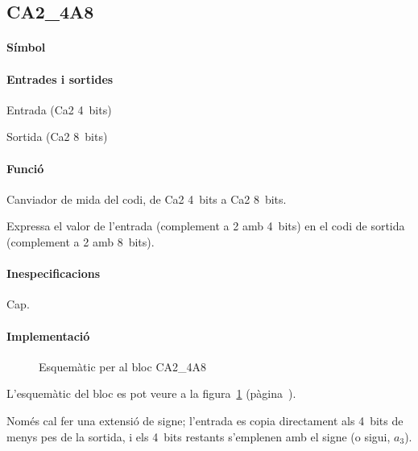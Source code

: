 \subsection{\label{sub:\projectname-CA2_4A8} \textsf{CA2\_4A8}}

\paragraph{Símbol}
\begin{center}  \end{center}

\paragraph{Entrades i sortides}

\begin{where}
\item[\nodenamerange{a}{3}{0}] Entrada (Ca2 4~bits)
\item[\nodenamerange{z}{7}{0}] Sortida (Ca2 8~bits)
\end{where}

\paragraph{Funció}

Canviador de mida del codi, de Ca2 4~bits a Ca2 8~bits.

Expressa el valor de l'entrada (complement a 2 amb 4~bits) en el codi
de sortida (complement a 2 amb 8~bits).

\paragraph{Inespecificacions}

Cap.

\paragraph{Implementació}

\begin{figure}[b]
  \begin{center}
  \end{center}
  \caption{\label{fig:\projectname-CA2_4A8} Esquemàtic per al bloc \textsf{CA2\_4A8}}
\end{figure}

L'esquemàtic del bloc es pot veure a la figura~\ref{fig:\projectname-CA2_4A8} (pàgina~\pageref{fig:\projectname-CA2_4A8}).

Només cal fer una extensió de signe; l'entrada es copia directament als 4~bits
de menys pes de la sortida, i els 4~bits restants s'emplenen amb el signe (o sigui,
$a_3$).

\vspace{1cm}
